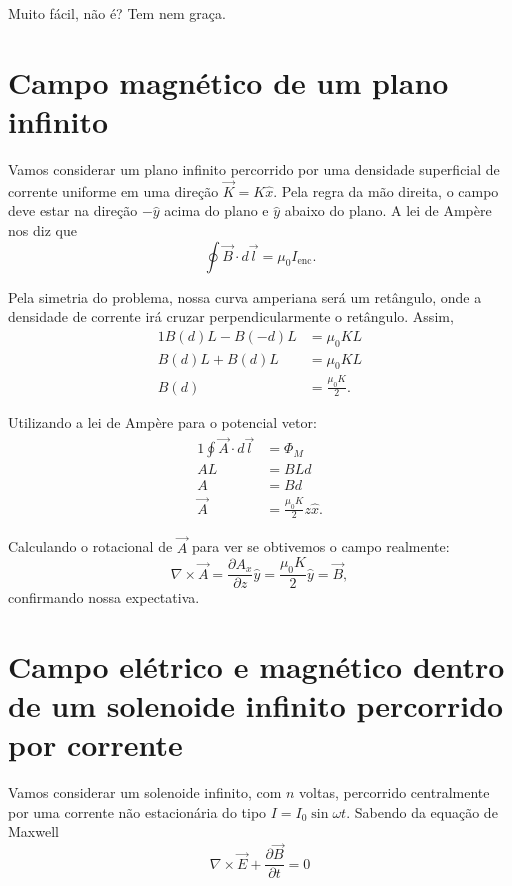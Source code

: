 \documentclass{article}
\begin{document}
Muito fácil, não é? Tem nem graça.

\section{Campo magnético de um plano infinito}
Vamos considerar um plano infinito percorrido por uma densidade superficial de corrente uniforme em uma direção $\vec{K} = K \hat{x}$. Pela regra da mão direita,
o campo deve estar na direção $-\hat{y}$ acima do plano e $\hat{y}$ abaixo do plano. A lei de Ampère nos diz que
\begin{equation}
 \oint \vec{B} \cdot d\vec{l} = \mu_0 I_{\mathrm{enc}}.
\end{equation}

Pela simetria do problema, nossa curva amperiana será um retângulo, onde a densidade de corrente irá cruzar perpendicularmente o retângulo. Assim,
\begin{alignat}{1}
 B(d) L - B(-d)L &= \mu_0 K L\\
 B(d) L + B(d)L &= \mu_0 K L\\
 B(d) &= \frac{\mu_0 K}{2}.
\end{alignat}

Utilizando a lei de Ampère para o potencial vetor:
\begin{alignat}{1}
 \oint \vec{A} \cdot d\vec{l} &= \Phi_M\\
 A L &= B L d\\
 A &= B d \\
 \vec{A} &= \frac{\mu_0 K}{2} z \hat{x}.
\end{alignat}

Calculando o rotacional de $\vec{A}$ para ver se obtivemos o campo realmente:
\begin{equation}
 \nabla \times \vec{A} = \frac{\partial A_x}{\partial z}\hat{y} = \frac{\mu_0 K}{2}\hat{y} = \vec{B},
\end{equation}
confirmando nossa expectativa.

\section{Campo elétrico e magnético dentro de um solenoide infinito percorrido por corrente}
Vamos considerar um solenoide infinito, com $n$ voltas, percorrido centralmente por uma corrente não estacionária do tipo $I = I_0 \sin{\omega t}$. Sabendo da equação
de Maxwell
\begin{equation}
 \nabla \times \vec{E} + \frac{\partial \vec{B}}{\partial t} = 0
\end{equation}
\end{document}
